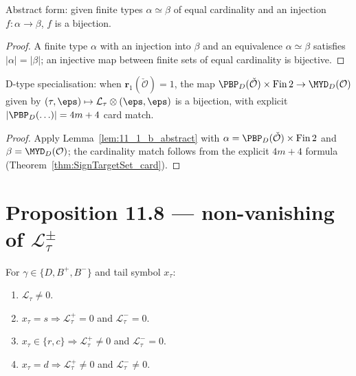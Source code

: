 \begin{lemma}
  \label{lem:11_1_b_abstract}
  \leanok
  Abstract form: given finite types $\alpha \simeq \beta$ of equal cardinality and an injection $f : \alpha \to \beta$, $f$ is a bijection.
\end{lemma}
\begin{proof}
  \leanok
  A finite type $\alpha$ with an injection into $\beta$ and an equivalence $\alpha \simeq \beta$ satisfies $|\alpha| = |\beta|$; an injective map between finite sets of equal cardinality is bijective.
\end{proof}


\begin{lemma}
  \label{lem:11_1_b_D}
  \leanok
  D-type specialisation: when $\mathbf{r}_1(\check{\mathcal{O}}) = 1$, the map
  $\PBP_D(\check{\mathcal{O}}) \times \mathrm{Fin}\,2 \to \MYD_D(\mathcal{O})$ given by $(\tau, \eps) \mapsto \mathcal{L}_\tau \otimes (\eps, \eps)$
  is a bijection, with explicit $|\PBP_D(\ldots)| = 4m + 4$ card match.
\end{lemma}
\begin{proof}
  \leanok
  Apply Lemma~\ref{lem:11_1_b_abstract} with $\alpha = \PBP_D(\check{\mathcal{O}}) \times \mathrm{Fin}\,2$ and $\beta = \MYD_D(\mathcal{O})$; the cardinality match follows from the explicit $4m + 4$ formula (Theorem~\ref{thm:SignTargetSet_card}).
\end{proof}


\section{Proposition 11.8 — non-vanishing of $\mathcal{L}_\tau^\pm$}

\begin{proposition}
  \label{prop:11_8_ac}
  \leanok
  For $\gamma \in \{D, B^+, B^-\}$ and tail symbol $x_\tau$:
  \begin{enumerate}
    \item[(a)] $\mathcal{L}_\tau \neq 0$.
    \item[(b)] $x_\tau = s \Rightarrow \mathcal{L}_\tau^+ = 0$ and $\mathcal{L}_\tau^- = 0$.
    \item[(c)] $x_\tau \in \{r, c\} \Rightarrow \mathcal{L}_\tau^+ \neq 0$ and $\mathcal{L}_\tau^- = 0$.
    \item[(d)] $x_\tau = d \Rightarrow \mathcal{L}_\tau^+ \neq 0$ and $\mathcal{L}_\tau^- \neq 0$.
  \end{enumerate}
\end{proposition}

